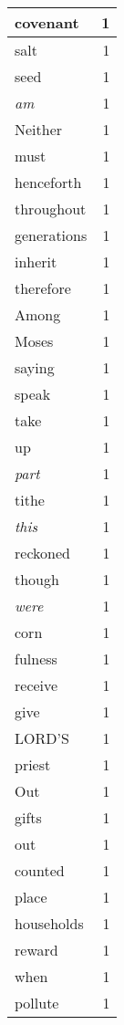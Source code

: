 \begin{center}
\begin{longtable}{l|r}
covenant & 1 \\ \hline
salt & 1 \\ \hline
seed & 1 \\ \hline
\emph{am} & 1 \\ \hline
Neither & 1 \\ \hline
must & 1 \\ \hline
henceforth & 1 \\ \hline
throughout & 1 \\ \hline
generations & 1 \\ \hline
inherit & 1 \\ \hline
therefore & 1 \\ \hline
Among & 1 \\ \hline
Moses & 1 \\ \hline
saying & 1 \\ \hline
speak & 1 \\ \hline
take & 1 \\ \hline
up & 1 \\ \hline
\emph{part} & 1 \\ \hline
tithe & 1 \\ \hline
\emph{this} & 1 \\ \hline
reckoned & 1 \\ \hline
though & 1 \\ \hline
\emph{were} & 1 \\ \hline
corn & 1 \\ \hline
fulness & 1 \\ \hline
receive & 1 \\ \hline
give & 1 \\ \hline
LORD'S & 1 \\ \hline
priest & 1 \\ \hline
Out & 1 \\ \hline
gifts & 1 \\ \hline
out & 1 \\ \hline
counted & 1 \\ \hline
place & 1 \\ \hline
households & 1 \\ \hline
reward & 1 \\ \hline
when & 1 \\ \hline
pollute & 1 \\ \hline
\end{longtable}
\end{center}



\normalsize



